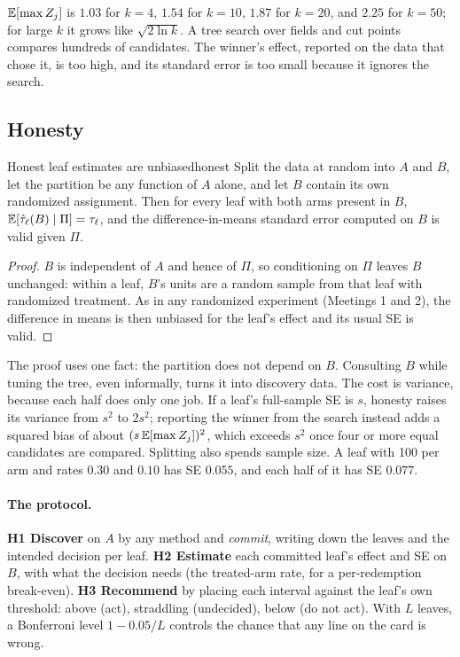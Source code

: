 \documentclass[11pt]{article}
\begin{document}
$\mathbb{E}[\max Z_j]$ is $1.03$ for $k = 4$, $1.54$ for $k = 10$, $1.87$ for $k = 20$, and $2.25$ for $k = 50$; for large
$k$ it grows like $\sqrt{2\ln k}$. A tree search over fields and cut points compares hundreds of candidates. The winner's
effect, reported on the data that chose it, is too high, and its standard error is too small because it ignores
the search.

\subsection{Honesty}

\begin{prop}{Honest leaf estimates are unbiased}{honest}
Split the data at random into $A$ and $B$, let the partition be any function of $A$ alone, and let $B$ contain its
own randomized assignment. Then for every leaf with both arms present in $B$,
$\mathbb{E}[\hat{\tau}_\ell(B) \mid \Pi] = \tau_\ell$, and the difference-in-means standard error computed on $B$ is valid given
$\Pi$.
\end{prop}
\begin{proof}
$B$ is independent of $A$ and hence of $\Pi$, so conditioning on $\Pi$ leaves $B$ unchanged: within a leaf, $B$'s
units are a random sample from that leaf with randomized treatment. As in any randomized experiment
(Meetings 1 and 2), the difference in means is then unbiased for the leaf's effect and its usual SE is valid.
\end{proof}

The proof uses one fact: the partition does not depend on $B$. Consulting $B$ while tuning the tree, even
informally, turns it into discovery data. The cost is variance, because each half does only one job. If a leaf's full-sample
SE is $s$, honesty raises its variance from $s^2$ to $2s^2$; reporting the winner from the search instead adds a
squared bias of about $(s\,\mathbb{E}[\max Z_j])^2$, which exceeds $s^2$ once four or more equal candidates are compared.
Splitting also spends sample size. A leaf with 100 per arm and rates $0.30$ and $0.10$ has SE $0.055$, and each half
of it has SE $0.077$.

\paragraph{The protocol.} \textbf{H1 Discover} on $A$ by any method and \emph{commit}, writing down the leaves and
the intended decision per leaf. \textbf{H2 Estimate} each committed leaf's effect and SE on $B$, with what the
decision needs (the treated-arm rate, for a per-redemption break-even). \textbf{H3 Recommend} by placing each
interval against the leaf's own threshold: above (act), straddling (undecided), below (do not act). With $L$
leaves, a Bonferroni level $1 - 0.05/L$ controls the chance that any line on the card is wrong.
\end{document}

